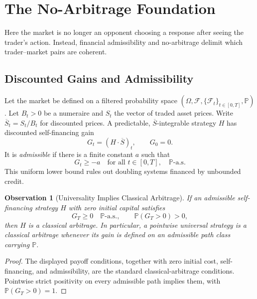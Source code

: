 \documentclass[aps,pra,reprint,superscriptaddress,amsmath,amssymb,floatfix]{revtex4-2}
\theoremstyle{plain}
\newtheorem{observation}[theorem]{Observation}
\theoremstyle{definition}
\theoremstyle{remark}
\begin{document}
\section{The No-Arbitrage Foundation}
\label{sec:noarb}

Here the market is no longer an opponent choosing a response after seeing the
trader's action. Instead, financial admissibility and no-arbitrage delimit
which trader--market pairs are coherent.

\subsection{Discounted Gains and Admissibility}

Let the market be defined on a filtered probability space
\((\Omega,\mathcal{F},\{\mathcal{F}_t\}_{t\in[0,T]},\mathbb{P})\).
Let \(B_t>0\) be a numeraire and \(S_t\) the vector of traded asset prices.
Write \(\overline S_t=S_t/B_t\) for discounted prices. A predictable,
\(\overline S\)-integrable strategy \(H\) has discounted self-financing gain
\begin{equation}
  G_t=(H\mathbin{\cdot}\overline S)_t,\qquad G_0=0.
  \label{eq:gain}
\end{equation}
It is \emph{admissible} if there is a finite constant \(a\) such that
\begin{equation}
  G_t\geq -a\quad\text{for all }t\in[0,T],\quad\mathbb{P}\text{-a.s.}
  \label{eq:admissible}
\end{equation}
This uniform lower bound rules out doubling systems financed by unbounded
credit.

\begin{observation}[Universality Implies Classical Arbitrage]
  \label{thm:arbitrage}
  If an admissible self-financing strategy \(H\) with zero initial capital
  satisfies
  \[
    G_T\geq0\quad\mathbb{P}\text{-a.s.},
    \qquad
    \mathbb{P}(G_T>0)>0,
  \]
  then \(H\) is a classical arbitrage. In particular, a pointwise universal
  strategy is a classical arbitrage whenever its gain is defined on an
  admissible path class carrying \(\mathbb{P}\).
\end{observation}

\begin{proof}
The displayed payoff conditions, together with zero initial cost,
self-financing, and admissibility, are the standard classical-arbitrage
conditions. Pointwise strict positivity on every admissible path implies them,
with \(\mathbb{P}(G_T>0)=1\).
\end{proof}
\end{document}

